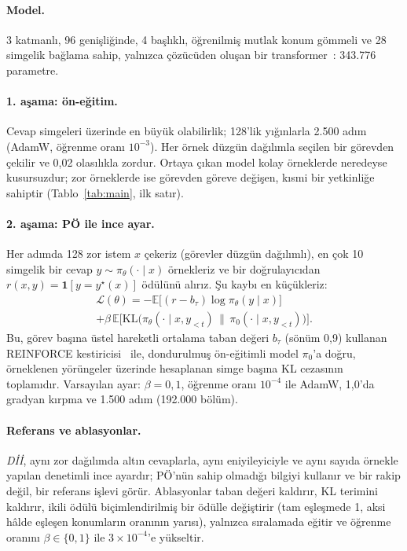 \documentclass[10pt,twocolumn]{article}
\newcommand{\E}{\mathbb{E}}
\begin{document}
\paragraph{Model.} 3 katmanlı, 96 genişliğinde, 4 başlıklı, öğrenilmiş mutlak konum gömmeli ve 28
simgelik bağlama sahip, yalnızca çözücüden oluşan bir transformer~\cite{vaswani2017}: 343.776
parametre.

\paragraph{1. aşama: ön-eğitim.} Cevap simgeleri üzerinde en büyük olabilirlik; 128'lik yığınlarla
2.500 adım (AdamW, öğrenme oranı $10^{-3}$). Her örnek düzgün dağılımla seçilen bir görevden çekilir
ve 0,02 olasılıkla zordur. Ortaya çıkan model kolay örneklerde neredeyse kusursuzdur; zor örneklerde
ise görevden göreve değişen, kısmi bir yetkinliğe sahiptir (Tablo~\ref{tab:main}, ilk satır).

\paragraph{2. aşama: PÖ ile ince ayar.} Her adımda 128 zor istem $x$ çekeriz (görevler düzgün
dağılımlı), en çok 10 simgelik bir cevap $y \sim \pi_\theta(\cdot\mid x)$ örnekleriz ve bir
doğrulayıcıdan $r(x,y)=\mathbf{1}[y=y^\star(x)]$ ödülünü alırız. Şu kaybı en küçükleriz:
\begin{multline*}
\mathcal{L}(\theta) = -\E\big[(r - b_{\tau})\log \pi_\theta(y\mid x)\big] \\
 + \beta\,\E\big[\mathrm{KL}\big(\pi_\theta(\cdot\mid x,y_{<t})\,\|\,\pi_{0}(\cdot\mid x,y_{<t})\big)\big].
\end{multline*}
Bu, görev başına üstel hareketli ortalama taban değeri $b_\tau$ (sönüm 0,9) kullanan REINFORCE
kestiricisi~\cite{williams1992} ile, dondurulmuş ön-eğitimli model $\pi_0$'a doğru, örneklenen
yörüngeler üzerinde hesaplanan simge başına KL cezasının~\cite{jaques2017} toplamıdır. Varsayılan
ayar: $\beta=0{,}1$, öğrenme oranı $10^{-4}$ ile AdamW, 1,0'da gradyan kırpma ve 1.500 adım
(192.000 bölüm).

\paragraph{Referans ve ablasyonlar.} \emph{Dİİ}, aynı zor dağılımda altın cevaplarla, aynı
eniyileyiciyle ve aynı sayıda örnekle yapılan denetimli ince ayardır; PÖ'nün sahip olmadığı bilgiyi
kullanır ve bir rakip değil, bir referans işlevi görür. Ablasyonlar taban değeri kaldırır, KL
terimini kaldırır, ikili ödülü biçimlendirilmiş bir ödülle değiştirir (tam eşleşmede 1, aksi hâlde
eşleşen konumların oranının yarısı), yalnızca sıralamada eğitir ve öğrenme oranını
$\beta\in\{0,1\}$ ile $3\times10^{-4}$'e yükseltir.
\end{document}
